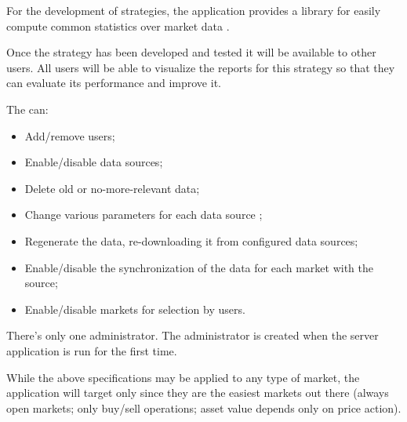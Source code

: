 For the development of strategies, the application provides a library for easily
compute common statistics over market data .

Once the strategy has been developed and tested it will be available to other
users. All users will be able to visualize the reports for this strategy so that
they can evaluate its performance and improve it.

The  can:
\begin{itemize}
	\item Add/remove users;
	\item Enable/disable data sources;
	\item Delete old or no-more-relevant data;
	\item Change various parameters for each data source ;
	\item Regenerate the data, re-downloading it from configured data
		sources;
	\item Enable/disable the synchronization of the data for each market
		with the source;
	\item Enable/disable markets for selection by users.
\end{itemize}

There's only one administrator. The administrator is created when the
server application is run for the first time.

While the above specifications may be applied to any type of market, the
application will target only  since they are
the easiest markets out there (always open markets; only buy/sell operations;
asset value depends only on price action).
